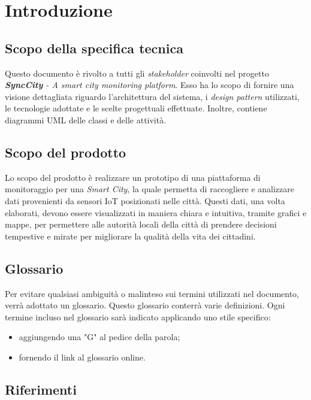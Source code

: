 \section{Introduzione}
\setcounter{subsection}{0}
\subsection{Scopo della specifica tecnica}
Questo documento è rivolto a tutti gli \textit{stakeholder} coinvolti nel progetto \textit{\textbf{SyncCity} - A smart city monitoring platform}.
Esso ha lo scopo di fornire una visione dettagliata riguardo l'architettura del sistema, i \textit{design pattern} utilizzati, le tecnologie adottate e le scelte progettuali effettuate.
Inoltre, contiene diagrammi UML delle classi e delle attività.

\subsection{Scopo del prodotto}
Lo scopo del prodotto è realizzare un prototipo di una piattaforma di monitoraggio per una \textit{Smart City}, la quale permetta di raccogliere e analizzare dati provenienti da sensori IoT posizionati nelle città.
Questi dati, una volta elaborati, devono essere visualizzati in maniera chiara e intuitiva, tramite grafici e mappe, per permettere alle autorità locali della città di prendere decisioni
tempestive e mirate per migliorare la qualità della vita dei cittadini.

\subsection{Glossario}
Per evitare qualsiasi ambiguità o malinteso sui termini utilizzati nel documento, verrà adottato un glossario. Questo glossario conterrà varie definizioni. Ogni termine incluso nel glossario sarà indicato applicando uno stile specifico:
\begin{itemize}
	\item aggiungendo una "G" al pedice della parola;
	\item fornendo il link al glossario online.
\end{itemize}

\subsection{Riferimenti}
